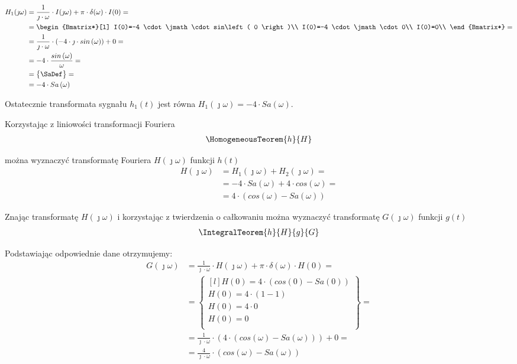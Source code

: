 \begin{task}
\begin{align*}
H_1(\jmath \omega) &= \frac{1}{\jmath \cdot \omega} \cdot I(\jmath \omega) + \pi \cdot \delta(\omega) \cdot I(0)=\\
&=\begin{Bmatrix*}[l]
I(0)=-4 \cdot \jmath \cdot sin\left( 0 \right)\\
I(0)=-4 \cdot \jmath \cdot 0\\
I(0)=0\\
\end{Bmatrix*}=\\
&=\frac{1}{\jmath \cdot \omega} \cdot \left(-4 \cdot \jmath \cdot sin\left( \omega \right)\right) + 0=\\
&=-4\cdot \frac{sin\left( \omega \right)}{\omega}=\\
&=\begin{Bmatrix}
\SaDef
\end{Bmatrix}=\\
&=-4\cdot Sa\left( \omega\right)
\end{align*}

Ostatecznie transformata sygnału $h_1(t)$ jest równa $H_1(\jmath \omega)=- 4 \cdot Sa\left( \omega\right)$.

Korzystając z liniowości transformacji Fouriera 
\begin{align*}
\HomogeneousTeorem{h}{H}
\end{align*}

można wyznaczyć transformatę Fouriera $H(\jmath \omega)$ funkcji $h(t)$
\begin{align*}
H(\jmath \omega) &= H_1(\jmath \omega)+H_2(\jmath \omega)=\\
&= -4\cdot Sa\left( \omega\right) + 4 \cdot cos\left( \omega \right)=\\
&= 4\cdot \left(cos\left( \omega\right) - Sa\left( \omega\right)\right)
\end{align*}

Znając transformatę $H(\jmath \omega)$ i korzystając z twierdzenia o całkowaniu można wyznaczyć transformatę $G(\jmath \omega)$ funkcji $g(t)$
\begin{align*}
\IntegralTeorem{h}{H}{g}{G}
\end{align*}
 
Podstawiając odpowiednie dane otrzymujemy:
 \begin{align*}
G(\jmath \omega) &= \frac{1}{\jmath \cdot \omega} \cdot H(\jmath \omega) + \pi \cdot \delta(\omega) \cdot H(0)=\\
&=\begin{Bmatrix*}[l]
H(0)=4\cdot \left(cos\left( 0\right) - Sa\left( 0\right)\right)\\
H(0)=4\cdot \left(1 -1 \right)\\
H(0)=4\cdot 0\\
H(0)=0\\
\end{Bmatrix*}=\\
&=\frac{1}{\jmath \cdot \omega} \cdot \left( 4\cdot \left(cos\left( \omega\right) - Sa\left( \omega\right)\right) \right) + 0=\\
&=\frac{4}{\jmath \cdot \omega} \cdot \left(cos\left( \omega\right) - Sa\left( \omega\right)\right)
\end{align*}


\end{task}
